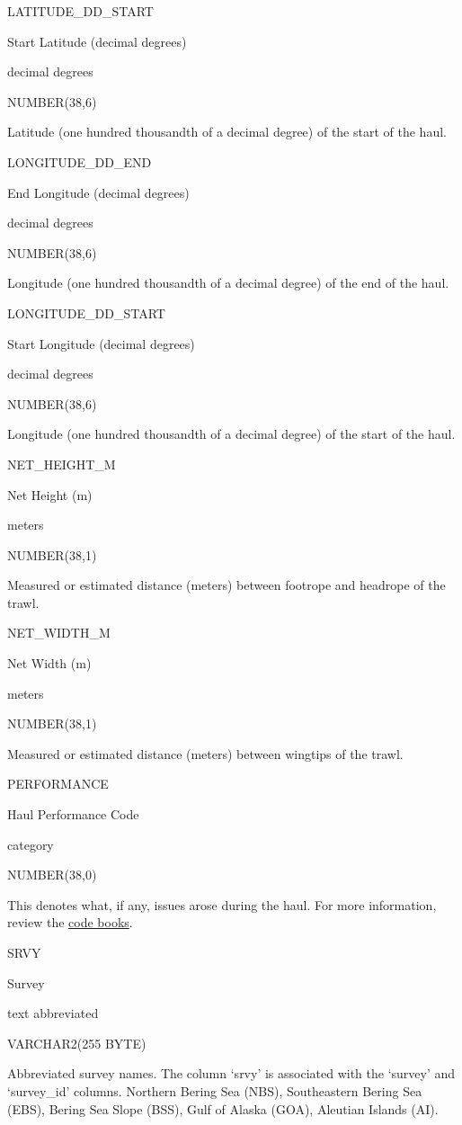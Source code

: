 \documentclass[
  letterpaper,
  oneside,
  open=any]{scrbook}
\begin{document}
LATITUDE\_DD\_START

Start Latitude (decimal degrees)

decimal degrees

NUMBER(38,6)

Latitude (one hundred thousandth of a decimal degree) of the start of
the haul.

LONGITUDE\_DD\_END

End Longitude (decimal degrees)

decimal degrees

NUMBER(38,6)

Longitude (one hundred thousandth of a decimal degree) of the end of the
haul.

LONGITUDE\_DD\_START

Start Longitude (decimal degrees)

decimal degrees

NUMBER(38,6)

Longitude (one hundred thousandth of a decimal degree) of the start of
the haul.

NET\_HEIGHT\_M

Net Height (m)

meters

NUMBER(38,1)

Measured or estimated distance (meters) between footrope and headrope of
the trawl.

NET\_WIDTH\_M

Net Width (m)

meters

NUMBER(38,1)

Measured or estimated distance (meters) between wingtips of the trawl.

PERFORMANCE

Haul Performance Code

category

NUMBER(38,0)

This denotes what, if any, issues arose during the haul. For more
information, review the
\href{https://www.fisheries.noaa.gov/resource/document/groundfish-survey-species-code-manual-and-data-codes-manual}{code
books}.

SRVY

Survey

text abbreviated

VARCHAR2(255 BYTE)

Abbreviated survey names. The column `srvy' is associated with the
`survey' and `survey\_id' columns. Northern Bering Sea (NBS),
Southeastern Bering Sea (EBS), Bering Sea Slope (BSS), Gulf of Alaska
(GOA), Aleutian Islands (AI).
\end{document}
